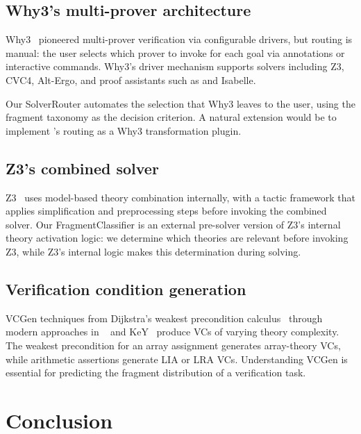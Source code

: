 \documentclass[11pt]{article}
\begin{document}
\subsection{Why3's multi-prover architecture}

Why3~\cite{why3} pioneered multi-prover verification via
configurable drivers, but routing is manual: the user
selects which prover to invoke for each goal via
annotations or interactive commands.  Why3's driver
mechanism supports solvers including Z3, CVC4, Alt-Ergo,
and proof assistants such as \Coq{} and Isabelle.

Our SolverRouter automates the selection that Why3 leaves
to the user, using the fragment taxonomy as the decision
criterion.  A natural extension would be to implement
\JuGeo{}'s routing as a Why3 transformation plugin.

\subsection{Z3's combined solver}

Z3~\cite{z3} uses model-based theory combination internally,
with a tactic framework that applies simplification and
preprocessing steps before invoking the combined solver.
Our FragmentClassifier is an external pre-solver version of
Z3's internal theory activation logic: we determine which
theories are relevant before invoking Z3, while Z3's
internal logic makes this determination during solving.

\subsection{Verification condition generation}

VCGen techniques from Dijkstra's weakest precondition
calculus~\cite{dijkstra} through modern approaches in
\Dafny{}~\cite{dafny} and KeY~\cite{key} produce VCs of
varying theory complexity.  The weakest precondition for
an array assignment generates array-theory VCs, while
arithmetic assertions generate LIA or LRA VCs.
Understanding VCGen is essential for predicting the
fragment distribution of a verification task.


\section{Conclusion}\label{sec:conclusion}
\end{document}
